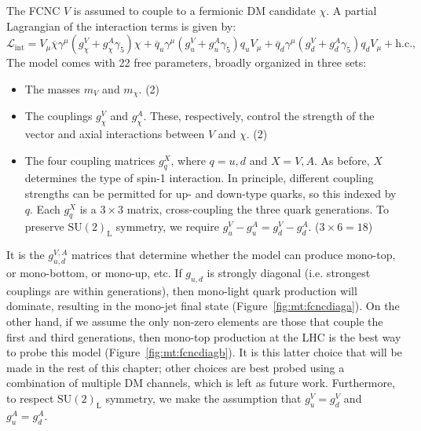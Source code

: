The FCNC $V$ is assumed to couple to a fermionic DM candidate $\chi$.
A partial Lagrangian of the interaction terms is given by:
\begin{equation}
\mathcal{L}_\text{int}=  V_\mu  \overline\chi \gamma^\mu (  g^V_{\chi} + g^A_{\chi} \gamma_5 ) \chi
                           + \overline{q}_u \gamma^\mu
                           ( g^V_u + g^A_u \gamma_5 ) q_u V_\mu
                           + \overline{q}_{d} \gamma^\mu
                           (  g^V_{d} + g^A_{d} \gamma_5 ) q_d V_\mu
                           + \text{h.c.},
    \label{eq:Lfcnc}
\end{equation}
The model comes with 22 free parameters, broadly organized in three sets:
\begin{itemize}
    \item The masses $m_V$ and $m_\chi$. (2)
    \item The couplings $g_\chi^V$ and $g_\chi^A$. These, respectively, control the strength of the vector and axial interactions between $V$ and $\chi$. (2)
    \item The four coupling matrices $g_{q}^{X}$, where $q=u,d$ and $X=V,A$.
          As before, $X$ determines the type of spin-1 interaction.
          In principle, different coupling strengths can be permitted for up- and down-type quarks, so this indexed by $q$.
          Each $g_{q}^{X}$ is a $3\times3$ matrix, cross-coupling the three quark generations.
          To preserve $\mathrm{SU}(2)_\mathrm{L}$ symmetry, we require $g_u^V - g_u^A = g_d^V - g_d^A$. ($3\times6=18$)
\end{itemize}

It is the $g_{u,d}^{V,A}$ matrices that determine whether the model can produce mono-top, or mono-bottom, or mono-up, etc.
If $g_{u,d}$ is strongly diagonal (i.e. strongest couplings are within generations), then mono-light quark production will dominate, resulting in the mono-jet final state (Figure~\ref{fig:mt:fcncdiaga}).
On the other hand, if we assume the only non-zero elements are those that couple the first and third generations, then mono-top production at the LHC is the best way to probe this model (Figure~\ref{fig:mt:fcncdiagb}).
It is this latter choice that will be made in the rest of this chapter; other choices are best probed using a combination of multiple DM channels, which is left as future work.
Furthermore, to respect $\mathrm{SU}(2)_\mathrm{L}$ symmetry, we make the assumption that $g_u^V = g_d^V$ and $g_u^A = g_d^A$.

